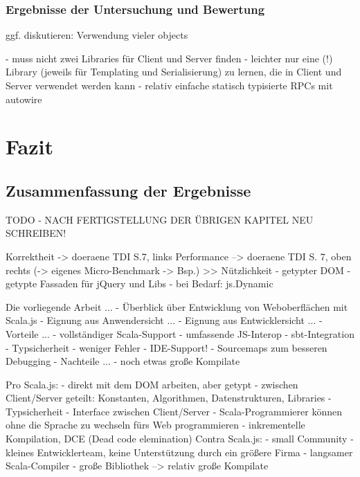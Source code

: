 \documentclass[a4paper, 12pt, hidelinks, listof=totoc, listoftables=totoc, bibliography=totoc]{scrreprt}
\begin{document}
\subsection{Ergebnisse der Untersuchung und Bewertung}


ggf. diskutieren: Verwendung vieler objects

- muss nicht zwei Libraries für Client und Server finden
- leichter nur eine (!) Library (jeweils für Templating und Serialisierung) zu lernen, die in Client und Server verwendet werden kann
\cite[\#SharingCode]{haoyi.HOS}
- relativ einfache statisch typisierte RPCs mit autowire




\chapter{Fazit}

\section{Zusammenfassung der Ergebnisse}

TODO - NACH FERTIGSTELLUNG DER ÜBRIGEN KAPITEL NEU SCHREIBEN!

   Korrektheit
	-> doeraene TDI S.7, links
   Performance
	--> doeraene TDI S. 7, oben rechts
	(-> eigenes Micro-Benchmark -> Bsp.)
>> Nützlichkeit
	- getypter DOM
	- getypte Fassaden für jQuery und Libs
	- bei Bedarf: js.Dynamic

Die vorliegende Arbeit ...
- Überblick über Entwicklung von Weboberflächen mit Scala.js
- Eignung aus Anwendersicht ...
- Eignung aus Entwicklersicht ...
- Vorteile ...
	- vollständiger Scala-Support
	- umfassende JS-Interop
	- sbt-Integration
	- Typsicherheit
		- weniger Fehler
		- IDE-Support!
	- Sourcemaps zum besseren Debugging
- Nachteile ...
	- noch etwas große Kompilate

Pro Scala.js:
    - direkt mit dem DOM arbeiten, aber getypt
    - zwischen Client/Server geteilt: Konstanten, Algorithmen, Datenstrukturen, Libraries
    - Typsicherheit
    - Interface zwischen Client/Server
    - Scala-Programmierer können ohne die Sprache zu wechseln fürs Web programmieren
    - inkrementelle Kompilation, DCE (Dead code elemination)
Contra Scala.js:
    - small Community
    - kleines Entwicklerteam, keine Unterstützung durch ein größere Firma
    - langsamer Scala-Compiler
    - große Bibliothek --> relativ große Kompilate
\end{document}
